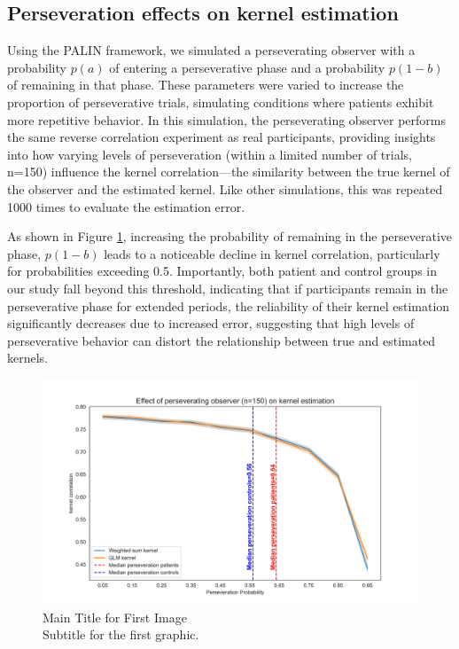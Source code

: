 \subsection{Perseveration effects on kernel estimation}
Using the PALIN framework, we simulated a perseverating observer with a probability $p(a)$ of entering a perseverative phase and a probability $p(1-b)$ of remaining in that phase. These parameters were varied to increase the proportion of perseverative trials, simulating conditions where patients exhibit more repetitive behavior. In this simulation, the perseverating observer performs the same reverse correlation experiment as real participants, providing insights into how varying levels of perseveration (within a limited number of trials, n=150) influence the kernel correlation—the similarity between the true kernel of the observer and the estimated kernel. Like other simulations, this was repeated 1000 times to evaluate the estimation error.

As shown in Figure \ref{fig:kernel_perseverating_observer}, increasing the probability of remaining in the perseverative phase, $p(1-b)$ leads to a noticeable decline in kernel correlation, particularly for probabilities exceeding 0.5. Importantly, both patient and control groups in our study fall beyond this threshold, indicating that if participants remain in the perseverative phase for extended periods, the reliability of their kernel estimation significantly decreases due to increased error, suggesting that high levels of perseverative behavior can distort the relationship between true and estimated kernels.
\begin{figure}[H]
    \centering
    \includegraphics[width=15cm]{MainLayout/Images/chapter5/kernel_perseverating_observer.jpg}
    \caption{Main Title for First Image \\ \small Subtitle for the first graphic.}
    \label{fig:kernel_perseverating_observer}
\end{figure}


